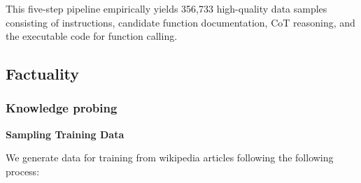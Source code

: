 This five-step pipeline empirically yields 356,733 high-quality data samples consisting of instructions, candidate function documentation, CoT reasoning, and the executable code for function calling.


\subsection{Factuality}\label{sec:factuality}

\subsubsection{Knowledge probing}\label{knowledge_probe_app}


\textbf{Sampling Training Data}

We generate data for training from wikipedia articles following the following process:

